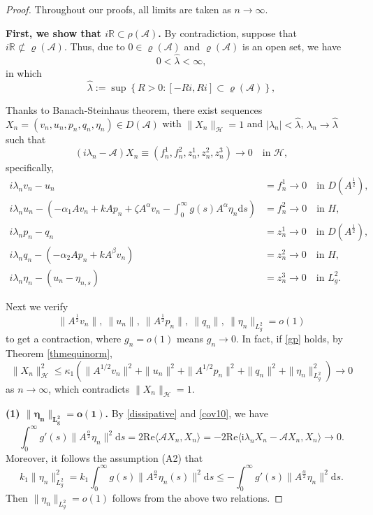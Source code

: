 \documentclass[10pt,a4paper]{amsart}
\begin{document}
	\begin{proof}
		Throughout our proofs, all limits are taken as $n\to\infty$.
		
\noindent \textbf{First, we show that ${i\mathbb{R} \subset \rho(\mathcal{A})}$.} By contradiction, suppose that $i\mathbb{R} \not\subset \varrho(\mathcal{A})$. Thus, due to $0 \in \varrho(\mathcal{A})$ and $\varrho(\mathcal{A})$ is an open set, we have
		\[
		0 < \hat{\lambda} < \infty,
		\]
		in which
		\[
		\hat{\lambda} := \sup\left\{ R > 0 : [-Ri, Ri] \subset \varrho(\mathcal{A}) \right\},
		\]
		
		Thanks to Banach-Steinhaus theorem, there exist sequences $X_n = (v_n, u_n, p_n, q_n, \eta_n) \in {D}(\mathcal{A})$ with $\|X_n\|_{\mathcal{H}} = 1$
		and $|\lambda_n| < \hat{\lambda}$, $\lambda_n \to \hat{\lambda}$ such that
		\begin{equation}\label{cov10}
			(i\lambda_n - \mathcal{A})X_n \equiv (f_n^1, f_n^2, z_n^1, z_n^2, z_n^3) \to 0 \quad \text{in } \mathcal{H},
		\end{equation}
		specifically,
		\begin{align}
			i\lambda_n v_n - u_n &= f_n^{1}\to0 \quad \text{in } {D}({A}^{\frac{1}{2}}), \label{gp1}\\
			i\lambda_n u_n - \left(-\alpha_1 A v_n + k A p_n + \zeta A^\alpha v_n - \int_0^\infty g(s) A^\alpha \eta_n\mathrm{d}s\right) &= f_n^{2}\to0 \quad \text{in } {H}, \label{gp2}\\
			i\lambda_n p_n - q_n &= z_n^{ 1}\to0 \quad \text{in } {D}({A}^{\frac{1}{2}}), \label{gp3}\\
			i\lambda_n q_n - \left(-\alpha_2 A p_n + k A^\beta v_n\right) &= z_n^{2}\to0 \quad \text{in } {H}, \label{gp4}\\
			i\lambda_n \eta_n - (u_n - \eta_{n,s}) &= z_n^{3}\to0 \quad \text{in } L_g^2.\label{gp5}
		\end{align}
		
		Next we verify
		\begin{equation}\label{gp}
			\|{A}^{\frac12}v_n\|,\ \|u_n\|,\ \|{A}^{\frac12}p_n\|,\ \|q_n\|,\ \|\eta_n\|_{L_g^2} = o(1)
		\end{equation}
		to get a contraction, where $g_n=o(1)$ means $g_n\to0$. In fact, if \eqref{gp} holds, by Theorem \ref{thmequinorm}, $$\|X_n\|_{\mathcal{H}}^2\le\kappa_1\left(\|A^{1/2}v_n\|^2+\|u_n\|^2+\|A^{1/2}p_n\|^2+\|q_n\|^2+\|\eta_n\|_{L^2_g}^2\right)\to0$$
		as $n\to\infty$, which contradicts $\|X_n\|_{\mathcal{H}}=1$.
		
	{\bf \noindent(1) $\bm{\|\eta_n\|_{L_g^2} =o(1)}$.}
		By \eqref{dissipative} and \eqref{cov10}, we have
		\[
		\int_0^\infty g'(s)\|A^{\frac{\alpha}{2}}\eta_n\|^2 \mathrm{d}s
		= 2\mathrm{Re}\langle \mathcal{A}X_n,X_n \rangle
		= -2\mathrm{Re}\langle \mathrm{i}\lambda_n X_n - \mathcal{A}X_n,X_n \rangle \to 0.
		\]
		Moreover, it follows the assumption (A2) that
		\[k_1\|\eta_n\|_{L^2_g}^2=k_1\int_0^\infty g(s)\|A^{\frac{\alpha}{2}}\eta_n(s)\|^2 \mathrm{d}s\le-\int_0^\infty g'(s)\|A^{\frac{\alpha}{2}}\eta_n\|^2 \mathrm{d}s.\]
		Then $\|\eta_n\|_{L_g^2} =o(1)$ follows from the above two relations.
		

\end{proof}
\end{document}
